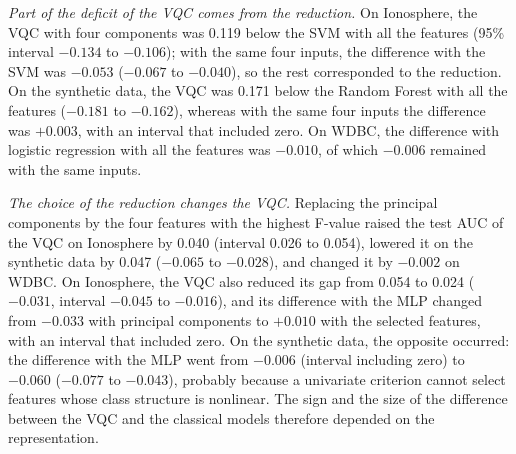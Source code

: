 \textit{Part of the deficit of the VQC comes from the reduction.} On Ionosphere, the VQC with four components was 0.119 below the SVM with all the features (95\% interval $-0.134$ to $-0.106$); with the same four inputs, the difference with the SVM was $-0.053$ ($-0.067$ to $-0.040$), so the rest corresponded to the reduction. On the synthetic data, the VQC was 0.171 below the Random Forest with all the features ($-0.181$ to $-0.162$), whereas with the same four inputs the difference was $+0.003$, with an interval that included zero. On WDBC, the difference with logistic regression with all the features was $-0.010$, of which $-0.006$ remained with the same inputs.

\textit{The choice of the reduction changes the VQC.} Replacing the principal components by the four features with the highest F-value raised the test AUC of the VQC on Ionosphere by 0.040 (interval 0.026 to 0.054), lowered it on the synthetic data by 0.047 ($-0.065$ to $-0.028$), and changed it by $-0.002$ on WDBC. On Ionosphere, the VQC also reduced its gap from 0.054 to 0.024 ($-0.031$, interval $-0.045$ to $-0.016$), and its difference with the MLP changed from $-0.033$ with principal components to $+0.010$ with the selected features, with an interval that included zero. On the synthetic data, the opposite occurred: the difference with the MLP went from $-0.006$ (interval including zero) to $-0.060$ ($-0.077$ to $-0.043$), probably because a univariate criterion cannot select features whose class structure is nonlinear. The sign and the size of the difference between the VQC and the classical models therefore depended on the representation.

